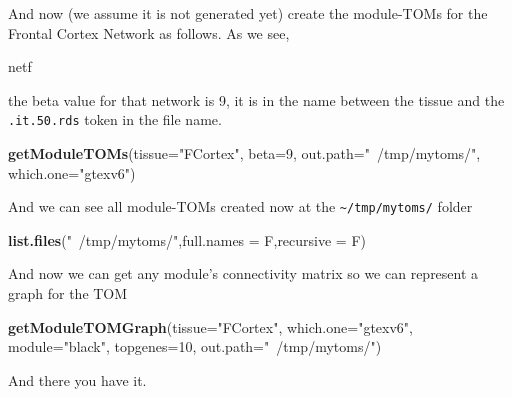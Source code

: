 \documentclass[]{book}
\newenvironment{Shaded}{\begin{snugshade}}{\end{snugshade}}
\newcommand{\KeywordTok}[1]{\textcolor[rgb]{0.13,0.29,0.53}{\textbf{#1}}}
\newcommand{\DataTypeTok}[1]{\textcolor[rgb]{0.13,0.29,0.53}{#1}}
\newcommand{\DecValTok}[1]{\textcolor[rgb]{0.00,0.00,0.81}{#1}}
\newcommand{\StringTok}[1]{\textcolor[rgb]{0.31,0.60,0.02}{#1}}
\newcommand{\NormalTok}[1]{#1}
\begin{document}
And now (we assume it is not generated yet) create the module-TOMs for
the Frontal Cortex Network as follows. As we see,

\begin{Shaded}
\begin{Highlighting}[]
\NormalTok{netf}
\end{Highlighting}
\end{Shaded}

the beta value for that network is 9, it is in the name between the
tissue and the \texttt{.it.50.rds} token in the file name.

\begin{Shaded}
\begin{Highlighting}[]
\KeywordTok{getModuleTOMs}\NormalTok{(}\DataTypeTok{tissue=}\StringTok{"FCortex"}\NormalTok{,}
              \DataTypeTok{beta=}\DecValTok{9}\NormalTok{,}
              \DataTypeTok{out.path=}\StringTok{"~/tmp/mytoms/"}\NormalTok{,}
              \DataTypeTok{which.one=}\StringTok{"gtexv6"}\NormalTok{)}
\end{Highlighting}
\end{Shaded}

And we can see all module-TOMs created now at the
\texttt{\textasciitilde{}/tmp/mytoms/} folder

\begin{Shaded}
\begin{Highlighting}[]
\KeywordTok{list.files}\NormalTok{(}\StringTok{"~/tmp/mytoms/"}\NormalTok{,}\DataTypeTok{full.names =}\NormalTok{ F,}\DataTypeTok{recursive =}\NormalTok{ F)}
\end{Highlighting}
\end{Shaded}

And now we can get any module's connectivity matrix so we can represent
a graph for the TOM

\begin{Shaded}
\begin{Highlighting}[]
\KeywordTok{getModuleTOMGraph}\NormalTok{(}\DataTypeTok{tissue=}\StringTok{"FCortex"}\NormalTok{,}
                  \DataTypeTok{which.one=}\StringTok{"gtexv6"}\NormalTok{,}
                  \DataTypeTok{module=}\StringTok{"black"}\NormalTok{,}
                  \DataTypeTok{topgenes=}\DecValTok{10}\NormalTok{,}
                  \DataTypeTok{out.path=}\StringTok{"~/tmp/mytoms/"}\NormalTok{)}
\end{Highlighting}
\end{Shaded}

And there you have it.
\end{document}

